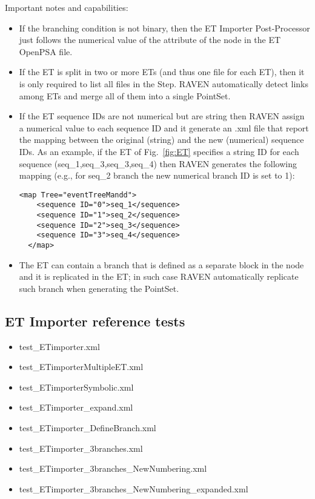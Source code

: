Important notes and capabilities:
\begin{itemize}
	\item If the branching condition is not binary, then the ET Importer Post-Processor just follows 
	      the numerical value of the  attribute of the  node in the ET OpenPSA file. 
	\item If the ET is split in two or more ETs (and thus one file for each ET), then it is only required to list 
	      all files in the Step. RAVEN automatically detect links among ETs and merge all of them into a single PointSet.
	\item If the ET sequence IDs are not numerical but are string then RAVEN assign a numerical value to each sequence ID
	      and it generate an .xml file that report the mapping between the original (string) and the new (numerical) 
	      sequence IDs. As an example, if the ET of Fig.~\ref{fig:ET} specifies a string ID for each sequence 
	      (seq\_1,seq\_3,seq\_3,seq\_4) then RAVEN generates the following mapping (e.g., for seq\_2 branch the new 
	      numerical branch ID is set to 1):
\begin{lstlisting}[style=XML,morekeywords={anAttribute},caption=ET Importer mapping., label=lst:ET_PP_mapping]
  <map Tree="eventTreeMandd">
    <sequence ID="0">seq_1</sequence>
    <sequence ID="1">seq_2</sequence>
    <sequence ID="2">seq_3</sequence>
    <sequence ID="3">seq_4</sequence>
  </map>
\end{lstlisting}
    \item The ET can contain a branch that is defined as a separate block in the  node and it is 
          replicated in the ET; in such case RAVEN automatically replicate such branch when generating the PointSet. 
\end{itemize}
 

\subsection{ET Importer reference tests}
\begin{itemize}
	\item test\_ETimporter.xml
	\item test\_ETimporterMultipleET.xml
	\item test\_ETimporterSymbolic.xml
	\item test\_ETimporter\_expand.xml
	\item test\_ETimporter\_DefineBranch.xml
	\item test\_ETimporter\_3branches.xml
	\item test\_ETimporter\_3branches\_NewNumbering.xml
	\item test\_ETimporter\_3branches\_NewNumbering\_expanded.xml
\end{itemize}